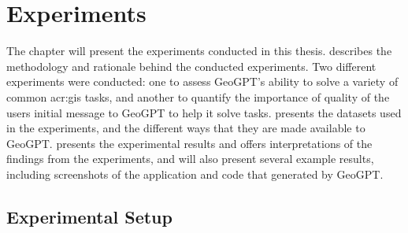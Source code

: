 \chapter{Experiments}
\label{cha:experiments}

The  chapter will present the experiments conducted in this thesis.  describes the methodology and rationale behind the conducted experiments. Two different experiments were conducted: one to assess GeoGPT's ability to solve a variety of common \acrshort{acr:gis} tasks, and another to quantify the importance of quality of the users initial message to GeoGPT to help it solve tasks.  presents the datasets used in the experiments, and the different ways that they are made available to GeoGPT.  presents the experimental results and offers interpretations of the findings from the experiments, and will also present several example results, including screenshots of the application and code that generated by GeoGPT.

\section{Experimental Setup}
\label{sec:experimental-setup}

\begin{comment}
Trying and failing is a major part of research. However, to have a chance of success you need a plan driving the experimental research, just as you need a plan for your literature search. Further, plans are made to be revised and this revision ensures that any further decisions made are in line with the work already completed.

The plan should include what experiments or series of experiments are planned and what questions the individual or set of experiments aim to answer. Such questions should be connected to your research questions, so that in the evaluation of your results you can discuss the results wrt to the research questions.
\end{comment}

\begin{comment}
The experimental setup should include all data --- parameters, etc. --- that would allow a person to repeat your experiments.
This will thus be the actual instantiation for each experiment of the general architecture described in Chapter~\ref{cha:architecture}.
\end{comment}

